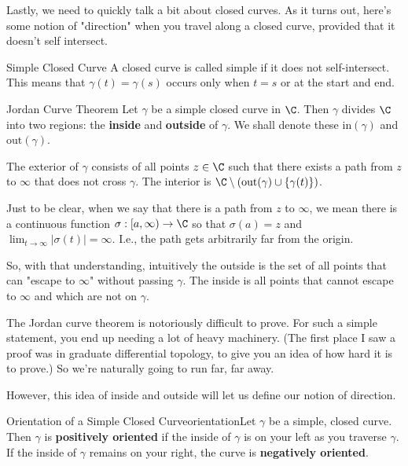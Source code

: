 Lastly, we need to quickly talk a bit about closed curves. As it turns out, here's some notion of "direction" when you travel along a closed curve, provided that it doesn't self intersect. 

\begin{defbo}{Simple Closed Curve}{}
A closed curve is called simple if it does not self-intersect. This means that $\gamma(t) = \gamma(s)$ occurs only when $t = s$ or at the start and end.
\end{defbo}

\begin{thmbo}{Jordan Curve Theorem}{} Let $\gamma$ be a simple closed curve in $\C$. Then $\gamma$ divides $\C$ into two regions: the {\bf inside} and {\bf outside} of $\gamma$. We shall denote these $\mathrm{in}(\gamma)$ and $\mathrm{out}(\gamma)$.

The exterior of $\gamma$ consists of all points $z\in \C$ such that there exists a path from $z$ to $\infty$ that does not cross $\gamma$. The interior is $\C\setminus (\mathrm{out}(\gamma) \cup \{\gamma(t)\})$.
\end{thmbo}

Just to be clear, when we say that there is a path from $z$ to $\infty$, we mean there is a continuous function $\sigma:[a,\infty)\rightarrow \C$ so that $\sigma(a) = z$ and $\lim_{t\rightarrow \infty} |\sigma(t)| = \infty$. I.e., the path gets arbitrarily far from the origin.

So, with that understanding, intuitively the outside is the set of all points that can "escape to $\infty$" without passing $\gamma$. The inside is all points that cannot escape to $\infty$ and which are not on $\gamma$.

The Jordan curve theorem is notoriously difficult to prove. For such a simple statement, you end up needing a lot of heavy machinery. (The first place I saw a proof was in graduate differential topology, to give you an idea of how hard it is to prove.) So we're naturally going to run far, far away.

However, this idea of inside and outside will let us define our notion of direction.

\begin{defbo}{Orientation of a Simple Closed Curve}{orientation}Let $\gamma$ be a simple, closed curve. Then $\gamma$ is {\bf positively oriented} if the inside of $\gamma$ is on your left as you traverse $\gamma$. If the inside of $\gamma$ remains on your right, the curve is {\bf negatively oriented}.
\end{defbo}

